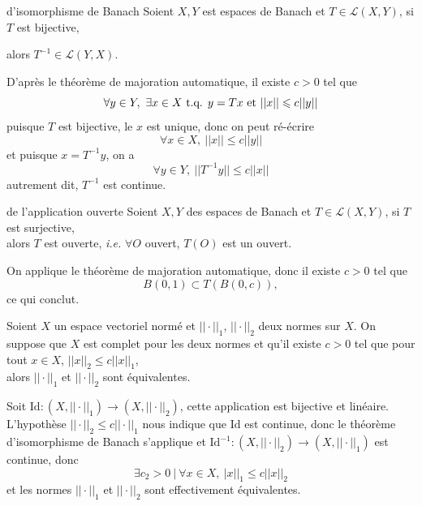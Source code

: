 \documentclass[a4paper,11pt, twoside]{article}
\begin{document}
\begin{thC}{d'isomorphisme de Banach}
  Soient $X,Y$ est espaces de Banach et $T\in \mathcal L(X,Y)$, si $T$ est bijective, 

  alors $T^{-1}\in \mathcal L(Y,X)$.
\end{thC}

\begin{Proof}
  D'après le théorème de majoration automatique, il existe $c>0$ tel que
  $$\forall y\in Y,\ \exists x\in X\text{ t.q. } y=Tx\text{ et }||x||\leqslant c||y||$$
  puisque $T$ est bijective, le $x$ est unique, donc on peut ré-écrire 
  $$\forall x\in X,\ ||x||\leqslant c||y||$$
  et puisque $x=T^{-1}y$, on a 
  $$\forall y\in Y,\ ||T^{-1}y||\leqslant c||x||$$
  autrement dit, $T^{-1}$ est continue. 
\end{Proof}


\begin{thC}{de l'application ouverte}
  Soient $X,Y$ des espaces de Banach et $T\in\mathcal L(X,Y)$, si $T$ est surjective,\\

  alors $T$ est ouverte, \emph{i.e.} $\forall O$ ouvert, $T(O)$ est un ouvert.
\end{thC}


\begin{Proof}
  On applique le théorème de majoration automatique, donc il existe $c>0$ tel que 
  $$B(0,1)\subset T\left(B(0,c)\right),$$
  ce qui conclut.
\end{Proof}


\begin{prop}
  Soient $X$ un espace vectoriel normé et $||\cdot||_1$, $||\cdot||_2$ deux normes sur $X$. On suppose que $X$ est complet pour les deux normes et qu'il existe $c>0$ tel que pour tout $x\in X$, $||x||_2\leqslant c||x||_1$,\\ 

  alors $||\cdot||_1$ et $||\cdot||_2$ sont équivalentes.
\end{prop}


\begin{Proof}
  Soit $\mathrm{Id}:(X,||\cdot||_1)\longrightarrow(X,||\cdot||_2)$, cette application est bijective et linéaire. L'hypothèse $||\cdot||_2\leqslant c||\cdot||_1$ nous indique que $\mathrm{Id}$ est continue, donc le théorème d'isomorphisme de Banach s'applique et $\mathrm{Id}^{-1}:(X,||\cdot||_2)\longrightarrow(X,||\cdot||_1)$ est continue, donc 
  $$\exists c_2>0\ |\ \forall x\in X,\ |x||_1\leqslant c||x||_2$$
  et les normes $||\cdot||_1$ et $||\cdot||_2$ sont effectivement équivalentes.
\end{Proof}
\end{document}
